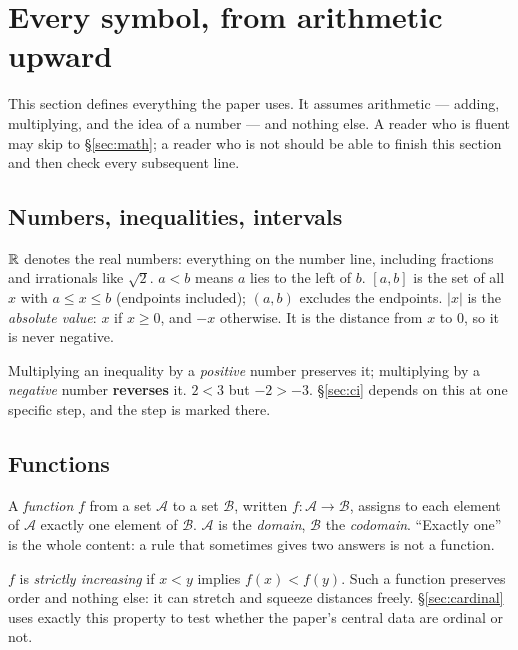 \section{Every symbol, from arithmetic upward}
\label{sec:notation}

This section defines everything the paper uses. It assumes arithmetic --- adding,
multiplying, and the idea of a number --- and nothing else. A reader who is
fluent may skip to §\ref{sec:math}; a reader who is not should be able to finish
this section and then check every subsequent line.

\subsection{Numbers, inequalities, intervals}

$\mathbb{R}$ denotes the real numbers: everything on the number line, including fractions
and irrationals like $\sqrt 2$. $a<b$ means $a$ lies to the left of $b$.
$[a,b]$ is the set of all $x$ with $a \le x \le b$ (endpoints included);
$(a,b)$ excludes the endpoints. $|x|$ is the \emph{absolute value}: $x$ if
$x \ge 0$, and $-x$ otherwise. It is the distance from $x$ to $0$, so it is never
negative.

 Multiplying an inequality by a \emph{positive}
number preserves it; multiplying by a \emph{negative} number \textbf{reverses}
it. $2<3$ but $-2>-3$. §\ref{sec:ci} depends on this at one specific step, and
the step is marked there.

\subsection{Functions}

A \emph{function} $f$ from a set $\mathcal{A}$ to a set $\mathcal{B}$, written
$f:\mathcal{A}\to\mathcal{B}$, assigns to each element of $\mathcal{A}$ exactly
one element of $\mathcal{B}$. $\mathcal{A}$ is the \emph{domain},
$\mathcal{B}$ the \emph{codomain}. ``Exactly one'' is the whole content: a rule
that sometimes gives two answers is not a function.

\begin{definition}[Monotone]
$f$ is \emph{strictly increasing} if $x<y$ implies $f(x)<f(y)$. Such a function
preserves order and nothing else: it can stretch and squeeze distances freely.
§\ref{sec:cardinal} uses exactly this property to test whether the paper's
central data are ordinal or not.
\end{definition}

